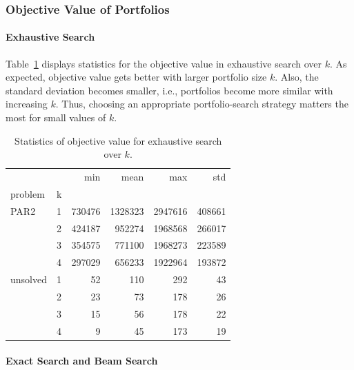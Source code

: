 \documentclass[conference]{IEEEtran}
\begin{document}
\subsubsection{Objective Value of Portfolios}

\paragraph{Exhaustive Search}

Table~\ref{tab:objective-exhaustive} displays statistics for the objective value in exhaustive search over $k$.
As expected, objective value gets better with larger portfolio size $k$.
Also, the standard deviation becomes smaller, i.e., portfolios become more similar with increasing $k$.
Thus, choosing an appropriate portfolio-search strategy matters the most for small values of $k$.

\begin{table}[htb]
	\centering
	\caption{Statistics of objective value for exhaustive search over $k$.}
	\label{tab:objective-exhaustive}
	\begin{tabular}{llrrrr}
		\toprule
		&   &     min &     mean &      max &     std \\
		problem & k &         &          &          &         \\
		\midrule
		PAR2 & 1 &  730476 &  1328323 &  2947616 &  408661 \\
		& 2 &  424187 &   952274 &  1968568 &  266017 \\
		& 3 &  354575 &   771100 &  1968273 &  223589 \\
		& 4 &  297029 &   656233 &  1922964 &  193872 \\
		unsolved & 1 &      52 &      110 &      292 &      43 \\
		& 2 &      23 &       73 &      178 &      26 \\
		& 3 &      15 &       56 &      178 &      22 \\
		& 4 &       9 &       45 &      173 &      19 \\
		\bottomrule
	\end{tabular}
\end{table}

\paragraph{Exact Search and Beam Search}
\end{document}
